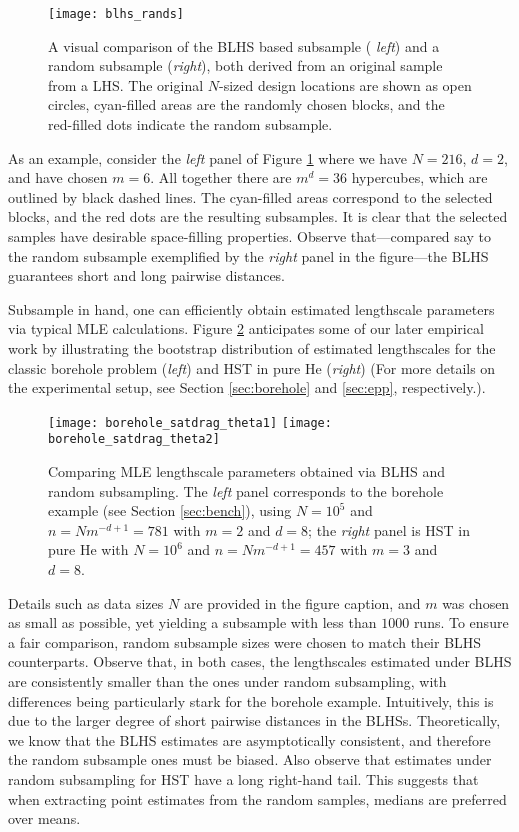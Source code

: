 \documentclass[12pt]{article}
\begin{document}
\begin{figure}[ht!]
\centering
\texttt{[image: blhs\_rands]}
\vspace{-0.4cm}
\caption{A visual comparison of the BLHS based subsample ({\em
left}) and a random subsample ({\em right}), both derived from an original
sample from a LHS. The original $N$-sized design locations are shown as open
circles, cyan-filled areas are the randomly chosen blocks, and the red-filled dots
indicate the random subsample.}
\label{f:blhs}
\end{figure}

As an example, consider the {\em left} panel of Figure \ref{f:blhs} where we
have $N=216$, $d=2$, and have chosen $m=6$. All together there are $m^d=36$
hypercubes, which are outlined by black dashed lines. The cyan-filled areas
correspond to the selected blocks, and the red dots are the resulting
subsamples. It is clear that the selected samples have desirable space-filling
properties. Observe that---compared say to the random subsample exemplified by
the {\em right} panel in the figure---the BLHS guarantees short and long
pairwise distances.

Subsample in hand, one can efficiently obtain estimated lengthscale parameters
via typical MLE calculations.  Figure \ref{f:blhs_theta} anticipates some of
our later empirical work by illustrating the bootstrap distribution of
estimated lengthscales for the classic borehole problem ({\em left}) and HST
in pure He ({\em right}) (For more details on the experimental setup, see
Section \ref{sec:borehole} and \ref{sec:epp}, respectively.).
\begin{figure}[ht!]
\centering
\texttt{[image: borehole\_satdrag\_theta1]}
\texttt{[image: borehole\_satdrag\_theta2]}
\caption{Comparing MLE lengthscale parameters obtained via BLHS and random subsampling.  The {\em left} panel corresponds to the
borehole example (see Section \ref{sec:bench}), using $N=10^5$ and
$n=Nm^{-d+1}=781$ with $m=2$ and $d=8$; the {\em right} panel is HST in pure
He with $N=10^6$ and $n=Nm^{-d+1}=457$ with $m=3$ and $d=8$.}
\label{f:blhs_theta}
\end{figure}
Details such as data sizes $N$ are provided in the figure caption, and $m$ was
chosen as small as possible, yet yielding a subsample with less than $1000$
runs. To ensure a fair comparison, random subsample sizes were chosen to match
their BLHS counterparts. Observe that, in both cases, the lengthscales
estimated under BLHS are consistently smaller than the ones under random
subsampling, with differences being particularly stark for the borehole
example. Intuitively, this is due to the larger degree of short pairwise
distances in the BLHSs.  Theoretically, we know that
the BLHS estimates are asymptotically consistent, and therefore the random
subsample ones must be biased.  Also observe that estimates under random
subsampling for HST have a long right-hand tail.  This suggests that when
extracting point estimates from the random samples, medians are preferred
over means.
\end{document}

